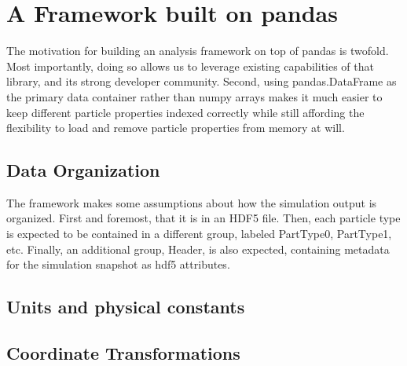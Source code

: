 \section{A Framework built on pandas}
\label{framework}

The motivation for building an analysis framework on top of pandas is twofold.  Most importantly, doing so allows us to leverage existing capabilities of that library, and its strong developer community.  Second, using pandas.DataFrame as the primary data container rather than numpy arrays makes it much easier to keep different particle properties indexed correctly while still affording the flexibility to load and remove particle properties from memory at will.

\subsection{Data Organization}
\label{hierarchy}
The framework makes some assumptions about how the simulation output is organized.  First and foremost, that it is in an HDF5 file.  Then, each particle type is expected to be contained in a different group, labeled PartType0, PartType1, etc.  Finally, an additional group, Header, is also expected, containing metadata for the simulation snapshot as hdf5 attributes.

\subsection{Units and physical constants}
\label{units}

\subsection{Coordinate Transformations}
\label{coordinates}